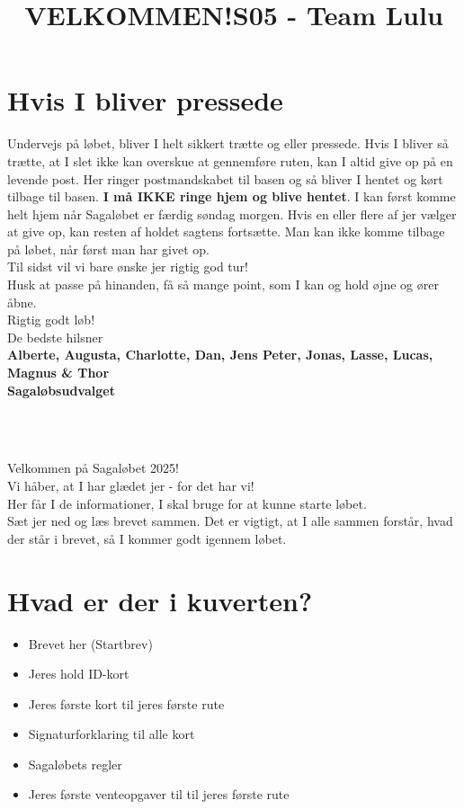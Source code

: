 \section{Hvis I bliver pressede}
Undervejs på løbet, bliver I helt sikkert trætte og eller pressede. Hvis I bliver så trætte, at I slet ikke kan overskue at gennemføre ruten, kan I altid give op på en levende post. Her ringer postmandskabet til basen og så bliver I hentet og kørt tilbage til basen. \textbf{I må IKKE ringe hjem og blive hentet}. I kan først komme helt hjem når Sagaløbet er færdig søndag morgen. Hvis en eller flere af jer vælger at give op, kan resten af holdet sagtens fortsætte. Man kan ikke komme tilbage på løbet, når først man har givet op.\\
\newline
Til sidst vil vi bare ønske jer rigtig god tur!\\
Husk at passe på hinanden, få så mange point, som I kan og hold øjne og ører åbne.\\
\newline
Rigtig godt løb!\\
\newline
\textcolor{søblå}{De bedste hilsner}\\
\textcolor{natblå}{\textbf{Alberte, Augusta, Charlotte, Dan, Jens Peter, Jonas, Lasse, Lucas, Magnus \& Thor}}\\
\textcolor{natblå}{\textbf{Sagaløbsudvalget}}\\
\newpage
\title{VELKOMMEN!}\\
\newline
\title{\textcolor{flammefarvet}{S05 - Team Lulu }}\\
\newline
Velkommen på Sagaløbet 2025!\\
Vi håber, at I har glædet jer - for det har vi!\\
Her får I de informationer, I skal bruge for at kunne starte løbet.\\
Sæt jer ned og læs brevet sammen. Det er vigtigt, at I alle sammen forstår, hvad der står i brevet, så I kommer godt igennem løbet.
\section{Hvad er der i kuverten?}
\begin{itemize}
    \item Brevet her (Startbrev)
    \item Jeres hold ID-kort
    \item Jeres første kort til jeres første rute
    \item Signaturforklaring til alle kort
    \item Sagaløbets regler
    \item Jeres første venteopgaver til til jeres første rute
\end{itemize}
